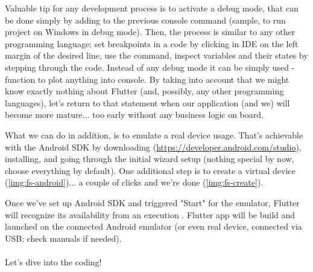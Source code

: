 Valuable tip for any development process is to activate a debug mode, that can be done simply by adding  to 
the previous console command (sample,  to run project on Windows in debug mode). Then, 
the process is similar to any other programming language: set breakpoints in a code by clicking in IDE on the left 
margin of the desired line, use the command, inspect variables and their states by stepping through the code. Instead of
any debug mode it can be simply used -function to plot anything into console. By taking into account that we 
might know exactly nothing about Flutter (and, possibly, any other programming languages), let's return to that 
statement when our application (and we) will become more mature... too early without any business logic on board.


What we can do in addition, is to emulate a real device usage. That's achievable with the Android SDK by downloading 
(\href{https://developer.android.com/studio}{https://developer.android.com/studio}), installing, and going through 
the initial wizard setup (nothing special by now, choose everything by default). One additional step is to create a 
virtual device (\cref{img:fs-android})... a couple of clicks and we're done (\cref{img:fs-create}).



Once we've set up Android SDK and triggered "Start" for the emulator, Flutter will recognize its availability from
an execution . Flutter app will be build and launched on the connected Android emulator (or even real 
device, connected via USB; check manuals if needed).\\
\\

\noindent Let's dive into the coding!